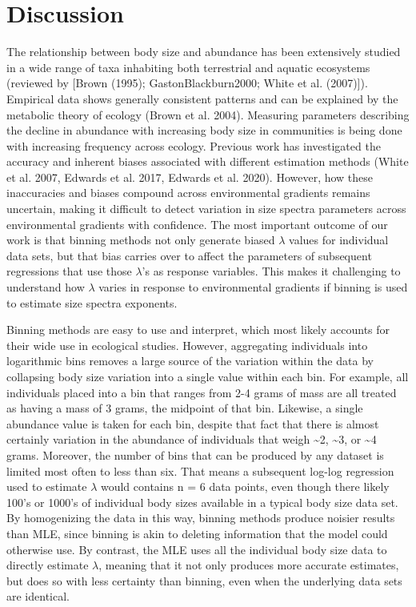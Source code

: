 \documentclass[
]{article}
\begin{document}
\newpage

\hypertarget{discussion}{%
\section{Discussion}\label{discussion}}

The relationship between body size and abundance has been extensively
studied in a wide range of taxa inhabiting both terrestrial and aquatic
ecosystems (reviewed by {[}Brown (1995); GastonBlackburn2000; White et
al. (2007){]}). Empirical data shows generally consistent patterns and
can be explained by the metabolic theory of ecology (Brown et al. 2004).
Measuring parameters describing the decline in abundance with increasing
body size in communities is being done with increasing frequency across
ecology. Previous work has investigated the accuracy and inherent biases
associated with different estimation methods (White et al. 2007, Edwards
et al. 2017, Edwards et al. 2020). However, how these inaccuracies and
biases compound across environmental gradients remains uncertain, making
it difficult to detect variation in size spectra parameters across
environmental gradients with confidence. The most important outcome of
our work is that binning methods not only generate biased \(\lambda\)
values for individual data sets, but that bias carries over to affect
the parameters of subsequent regressions that use those \(\lambda\)'s as
response variables. This makes it challenging to understand how
\(\lambda\) varies in response to environmental gradients if binning is
used to estimate size spectra exponents.

Binning methods are easy to use and interpret, which most likely
accounts for their wide use in ecological studies. However, aggregating
individuals into logarithmic bins removes a large source of the
variation within the data by collapsing body size variation into a
single value within each bin. For example, all individuals placed into a
bin that ranges from 2-4 grams of mass are all treated as having a mass
of 3 grams, the midpoint of that bin. Likewise, a single abundance value
is taken for each bin, despite that fact that there is almost certainly
variation in the abundance of individuals that weigh \textasciitilde2,
\textasciitilde3, or \textasciitilde4 grams. Moreover, the number of
bins that can be produced by any dataset is limited most often to less
than six. That means a subsequent log-log regression used to estimate
\(\lambda\) would contains n = 6 data points, even though there likely
100's or 1000's of individual body sizes available in a typical body
size data set. By homogenizing the data in this way, binning methods
produce noisier results than MLE, since binning is akin to deleting
information that the model could otherwise use. By contrast, the MLE
uses all the individual body size data to directly estimate \(\lambda\),
meaning that it not only produces more accurate estimates, but does so
with less certainty than binning, even when the underlying data sets are
identical.
\end{document}

